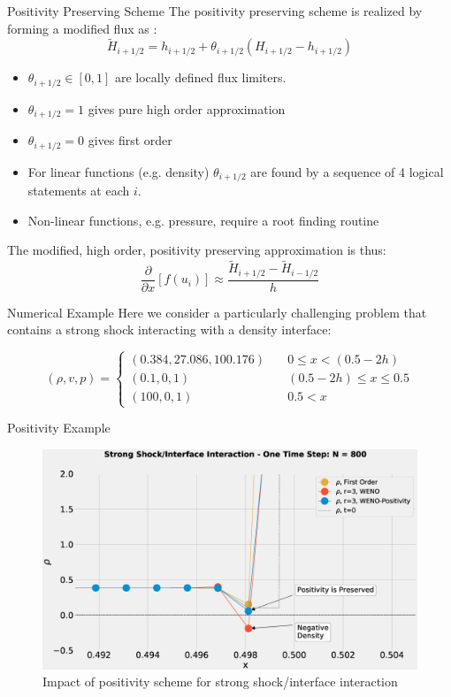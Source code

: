 \documentclass[10pt]{beamer}
\begin{document}
\begin{frame}{Positivity Preserving Scheme}
  The positivity preserving scheme is realized by forming a modified flux as \cite{Positivity2013,Positivity2014}: 
  $$\tilde{H}_{i+1/2}=h_{i+1/2} + \theta_{i+1/2}(H_{i+1/2} - h_{i+1/2})$$
  
  \begin{itemize}
    \item $\theta_{i+1/2} \in [0,1]$ are locally defined flux limiters.
    \item $\theta_{i+1/2} =1$ gives pure high order approximation
    \item $\theta_{i+1/2} =0$ gives first order
    \item For linear functions (e.g. density) $\theta_{i+1/2}$ are found by a sequence of 4 logical statements at each $i$. 
    \item Non-linear functions, e.g. pressure, require a root finding routine
  \end{itemize}

  The modified, high order, positivity preserving approximation is thus:
  $$
  \frac{\partial}{\partial x}[f(u_i)] \approx \frac{\tilde{H}_{i+1 /2} - \tilde{H}_{i-1/2}}{h}
  $$
\end{frame}

\begin{frame}{Numerical Example}
  Here we consider a particularly challenging problem that contains a strong shock interacting with a density interface:

  $$
  (\rho, v, p) = 
  \begin{cases} 
  (0.384,27.086,100.176)& \quad 0 \leq x < (0.5 - 2h) \\
  (0.1,0,1)& \quad (0.5 - 2h) \leq x \leq 0.5\\
  (100,0,1)& \quad  0.5 < x
  \end{cases}
  $$
\end{frame}

\begin{frame}{Positivity Example}
  \begin{figure}[H]
    \centering
    \includegraphics[scale=0.275]{PositivityZoomDenstiy.eps}\caption{Impact of positivity scheme for strong shock/interface interaction}
    \end{figure}
\end{frame}
\end{document}
